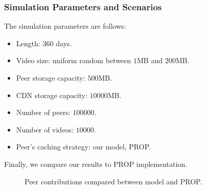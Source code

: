\documentclass[10pt,final,journal,a4paper]{IEEEtran}
\begin{document}


\subsubsection{Simulation Parameters and Scenarios}
The simulation parameters are follows:

\begin{itemize}
\item Length: $360$ days.
\item Video size: uniform random between $1$MB and $200$MB.
\item Peer storage capacity: $500$MB.
\item CDN storage capacity: $10000$MB.
\item Number of peers: $100000$.
\item Number of videos: $10000$.
\item Peer's caching strategy: our model, PROP.
\end{itemize}
Finally, we compare our results to PROP \cite{1613869} implementation.




\begin{figure}[!t]
\centering
{}
\hfill
{}
\hfill
{}
\vspace{2mm}
\caption{Peer contributions compared between model and PROP.}
\label{fig:peercontribution}
\end{figure}
\end{document}
